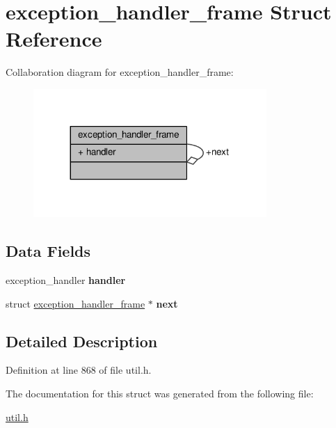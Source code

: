 \hypertarget{structexception__handler__frame}{}\section{exception\+\_\+handler\+\_\+frame Struct Reference}
\label{structexception__handler__frame}


Collaboration diagram for exception\+\_\+handler\+\_\+frame\+:
\nopagebreak
\begin{figure}[H]
\begin{center}
\leavevmode
\includegraphics[width=251pt]{structexception__handler__frame__coll__graph}
\end{center}
\end{figure}
\subsection*{Data Fields}
\begin{DoxyCompactItemize}
\item 
exception\+\_\+handler {\bfseries handler}\hypertarget{structexception__handler__frame_a9df815cc8cec8aace242043b89fb44e8}{}\label{structexception__handler__frame_a9df815cc8cec8aace242043b89fb44e8}

\item 
struct \hyperlink{structexception__handler__frame}{exception\+\_\+handler\+\_\+frame} $\ast$ {\bfseries next}\hypertarget{structexception__handler__frame_a407cf31d00d01b49b1774dea464c29cf}{}\label{structexception__handler__frame_a407cf31d00d01b49b1774dea464c29cf}

\end{DoxyCompactItemize}


\subsection{Detailed Description}


Definition at line 868 of file util.\+h.



The documentation for this struct was generated from the following file\+:\begin{DoxyCompactItemize}
\item 
\hyperlink{util_8h}{util.\+h}\end{DoxyCompactItemize}
